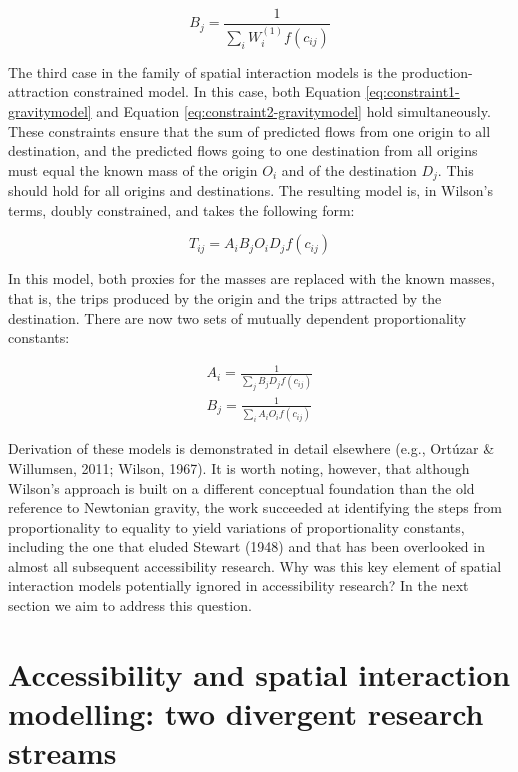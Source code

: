 \documentclass[
11pt, %
oneside, %
english, %
singlespacing, %
]{macthesis} %
\begin{document}
\begin{equation}
\label{eq:attraction-constrained-balancing-factor}
B_j = \frac{1}{\sum_i W_i^{(1)} f(c_{ij})}
\end{equation} 

The third case in the family of spatial interaction models is the production-attraction constrained model. In this case, both Equation \ref{eq:constraint1-gravitymodel} and Equation \ref{eq:constraint2-gravitymodel} hold simultaneously. These constraints ensure that the sum of predicted flows from one origin to all destination, and the predicted flows going to one destination from all origins must equal the known mass of the origin \(O_i\) and of the destination \(D_j\). This should hold for all origins and destinations. The resulting model is, in Wilson's terms, doubly constrained, and takes the following form:

\begin{equation}
\label{eq:doubly-constrained-gravitymodel}
T_{ij} = A_i B_j O_i D_j f(c_{ij})
\end{equation} 

In this model, both proxies for the masses are replaced with the known masses, that is, the trips produced by the origin and the trips attracted by the destination. There are now two sets of mutually dependent proportionality constants:

\begin{equation}
\label{eq:doubly-constrained-balancing-factors}
\begin{array}{l}
A_i = \frac{1}{\sum_j B_j D_j f(c_{ij})}\\
B_j = \frac{1}{\sum_i A_i O_i f(c_{ij})}
\end{array}
\end{equation} 

Derivation of these models is demonstrated in detail elsewhere (e.g., Ortúzar \& Willumsen, 2011; Wilson, 1967). It is worth noting, however, that although Wilson's approach is built on a different conceptual foundation than the old reference to Newtonian gravity, the work succeeded at identifying the steps from proportionality to equality to yield variations of proportionality constants, including the one that eluded Stewart (1948) and that has been overlooked in almost all subsequent accessibility research. Why was this key element of spatial interaction models potentially ignored in accessibility research? In the next section we aim to address this question.

\section{Accessibility and spatial interaction modelling: two divergent research streams}\label{accessibility-and-spatial-interaction-modelling-two-divergent-research-streams}
\end{document}
